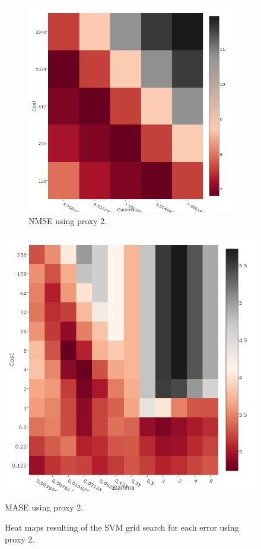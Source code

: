 \begin{center}
\begin{figure}[!h]
{\begin{subfigure}{.55\linewidth}
  \includegraphics[width=\linewidth, height = 0.32\textheight]{img/6mNMSEma.png}
  \caption{NMSE using proxy 2.}
  \label{fig:heat22}
\end{subfigure}}
  \centering
  \includegraphics[width=0.6\linewidth, height = 0.34\textheight]{img/6mMASEma.png}
  \caption{MASE using proxy 2.}
  \label{fig:heat33}
\caption{Heat maps resulting of the SVM grid search for each error using proxy 2.}
\label{fig:heat6mp2}
\end{figure}\end{center}
